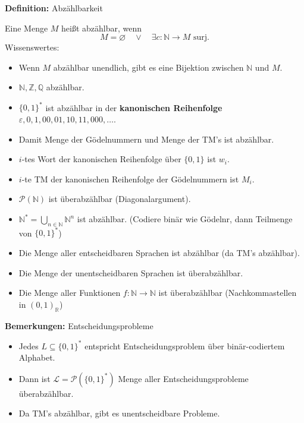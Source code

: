 \documentclass[a4paper,graphics,11pt]{article}
\newcommand{\eps}[0]{\varepsilon}
\begin{document}
\textbf{Definition:} Abzählbarkeit

Eine Menge $M$ heißt abzählbar, wenn
$$
    M = \varnothing\quad \lor\quad \exists c : \mathbb{N} \to M \text{ surj.}
$$
Wissenswertes:
\begin{itemize}
    \item Wenn $M$ abzählbar unendlich, gibt es eine Bijektion zwischen $\mathbb{N}$ und $M$.
    \item $\mathbb{N}, \mathbb{Z}, \mathbb{Q}$ abzählbar.
    \item $\{0,1\}^*$ ist abzählbar in der \textbf{kanonischen Reihenfolge}
        $\eps, 0,1, 00, 01, 10, 11, 000, \dots$.
    \item Damit Menge der Gödelnummern und Menge der TM's ist abzählbar.
    \\
    \item $i$-tes Wort der kanonischen Reihenfolge über $\{0,1\}$ ist $w_i$.
    \item $i$-te TM der kanonischen Reihenfolge der Gödelnummern ist $M_i$.
    \\
    \item $\mathcal{P}(\mathbb{N})$ ist überabzählbar (Diagonalargument).
    \item $\mathbb{N}^* = \bigcup_{n \in \mathbb{N}}\mathbb{N}^n$ ist abzählbar. (Codiere binär
        wie Gödelnr, dann Teilmenge von $\{0,1\}^*$)
    \item Die Menge aller entscheidbaren Sprachen ist abzählbar (da TM's abzählbar).
    \item Die Menge der unentscheidbaren Sprachen ist überabzählbar.
    \item Die Menge aller Funktionen $f : \mathbb{N} \to \mathbb{N}$ ist überabzählbar
        (Nachkommastellen in $(0,1)_\mathbb{R}$)
\end{itemize}

\strut

\textbf{Bemerkungen:} Entscheidungsprobleme

\begin{itemize}
    \item Jedes $L \subseteq \{0,1\}^*$ entspricht Entscheidungsproblem über binär-codiertem
        Alphabet.
    \item Dann ist $\mathcal{L} = \mathcal{P}(\{0,1\}^*)$ Menge aller Entscheidungsprobleme
        überabzählbar.
    \item Da TM's abzählbar, gibt es unentscheidbare Probleme.
\end{itemize}
\end{document}
